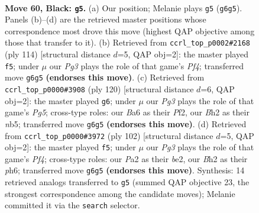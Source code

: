 \documentclass[11pt]{article}
\begin{document}
\clearpage

\begin{figure}[p]\centering
\begin{subfigure}{0.46\textwidth}\centering
\resizebox{\linewidth}{!}{%
\newchessgame
\chessboard[
  setfen={7K/8/b5p1/7k/8/8/p6b/8 b - - 7 60},
  showmover=false,
  pgfstyle=straightmove, color=movearrow, markmove={g6-g5}
]}
\caption{}
\end{subfigure}\hfill
\begin{subfigure}{0.46\textwidth}\centering
\resizebox{\linewidth}{!}{%
\newchessgame
\chessboard[
  setfen={8/5k2/8/4K3/1p3P2/1P1B4/8/6b1 w - - 17 58},
  showmover=false,
  pgfstyle=straightmove, color=movearrow, markmove={f4-f5}
]}
\caption{}
\end{subfigure}
\\[4pt]
\begin{subfigure}{0.46\textwidth}\centering
\resizebox{\linewidth}{!}{%
\newchessgame
\chessboard[
  setfen={8/1k6/5K2/1n4P1/8/5p2/5P2/8 w - - 2 61},
  showmover=false,
  pgfstyle=straightmove, color=movearrow, markmove={g5-g6}
]}
\caption{}
\end{subfigure}\hfill
\begin{subfigure}{0.46\textwidth}\centering
\resizebox{\linewidth}{!}{%
\newchessgame
\chessboard[
  setfen={k7/8/7p/4K3/5P2/8/4b3/4B3 w - - 3 52},
  showmover=false,
  pgfstyle=straightmove, color=movearrow, markmove={f4-f5}
]}
\caption{}
\end{subfigure}
\caption{\textbf{Move 60, Black: \texttt{g5}.} (a) Our position; Melanie plays \texttt{g5} (\texttt{g6g5}). Panels (b)--(d) are the retrieved master positions whose correspondence most drove this move (highest QAP objective among those that transfer to it). (b) Retrieved from \texttt{ccrl\_top\_p0002\#2168} (ply 114) [structural distance $d$=5, QAP obj=2]: the master played \texttt{f5}; under $\mu$ our \emph{Pg3} plays the role of that game's \emph{Pf4}; transferred move \texttt{g6g5} \textbf{(endorses this move)}. (c) Retrieved from \texttt{ccrl\_top\_p0000\#3908} (ply 120) [structural distance $d$=6, QAP obj=2]: the master played \texttt{g6}; under $\mu$ our \emph{Pg3} plays the role of that game's \emph{Pg5}; cross-type roles: our \emph{B}a6 as their \emph{P}f2, our \emph{B}h2 as their \emph{n}b5; transferred move \texttt{g6g5} \textbf{(endorses this move)}. (d) Retrieved from \texttt{ccrl\_top\_p0000\#3972} (ply 102) [structural distance $d$=5, QAP obj=2]: the master played \texttt{f5}; under $\mu$ our \emph{Pg3} plays the role of that game's \emph{Pf4}; cross-type roles: our \emph{P}a2 as their \emph{b}e2, our \emph{B}h2 as their \emph{p}h6; transferred move \texttt{g6g5} \textbf{(endorses this move)}. Synthesis: 14 retrieved analogs transferred to \texttt{g5} (summed QAP objective 23, the strongest correspondence among the candidate moves); Melanie committed it via the \texttt{search} selector.}
\label{fig:thought-m119}
\end{figure}
\end{document}
